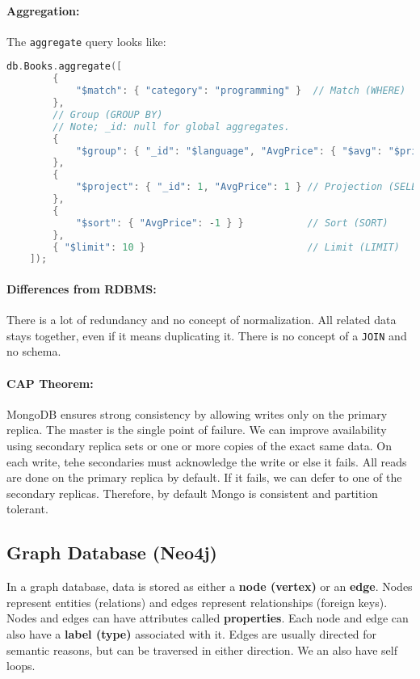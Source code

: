 \documentclass{report}
\renewcommand{\bf}[1]{\textbf{{#1}}}
\renewcommand{\tt}[1]{\texttt{{#1}}}
\begin{document}
\paragraph{Aggregation:} The \tt{aggregate} query looks like:
\begin{lstlisting}[language=C++, style=colorEX]
    db.Books.aggregate([
        {
            "$match": { "category": "programming" }  // Match (WHERE)
        },
        // Group (GROUP BY)
        // Note; _id: null for global aggregates.
        {
            "$group": { "_id": "$language", "AvgPrice": { "$avg": "$price" } }
        },
        {
            "$project": { "_id": 1, "AvgPrice": 1 } // Projection (SELECT)
        },
        {
            "$sort": { "AvgPrice": -1 } }           // Sort (SORT)
        },
        { "$limit": 10 }                            // Limit (LIMIT)
    ]);
\end{lstlisting}

\paragraph{Differences from RDBMS:} There is a lot of redundancy and no concept
of normalization. All related data stays together, even if it means duplicating
it. There is no concept of a \tt{JOIN} and no schema.

\paragraph{CAP Theorem:} MongoDB ensures strong consistency by allowing writes
only on the primary replica. The master is the single point of failure. We can
improve availability using secondary replica sets or one or more copies of the
exact same data. On each write, tehe secondaries must acknowledge the write or
else it fails. All reads are done on the primary replica by default. If it
fails, we can defer to one of the secondary replicas. Therefore, by default
Mongo is consistent and partition tolerant.


\subsection{Graph Database (Neo4j)}
In a graph database, data is stored as either a \bf{node (vertex)} or an
\bf{edge}. Nodes represent entities (relations) and edges represent
relationships (foreign keys). Nodes and edges can have attributes called
\bf{properties}. Each node and edge can also have a \bf{label (type)} associated
with it. Edges are usually directed for semantic reasons, but can be traversed
in either direction. We an also have self loops.
\end{document}
